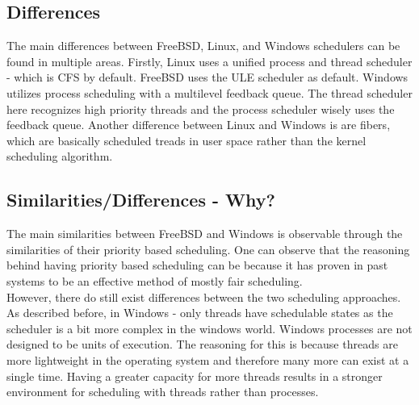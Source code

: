 \documentclass[letterpaper,10pt,titlepage]{article}
\begin{document}
\subsection{Differences}

The main differences between FreeBSD, Linux, and Windows schedulers can be found in multiple areas.  Firstly, Linux uses a unified process and thread scheduler - which is CFS by default.  FreeBSD uses the ULE scheduler as default.  Windows utilizes process scheduling with a multilevel feedback queue.  The thread scheduler here recognizes high priority threads and the process scheduler wisely uses the feedback queue.  Another difference between Linux and Windows is are fibers, which are basically scheduled treads in user space rather than the kernel scheduling algorithm.\\

\subsection{Similarities/Differences - Why?}

The main similarities between FreeBSD and Windows is observable through the similarities of their priority based scheduling.  One can observe that the reasoning behind having priority based scheduling can be because it has proven in past systems to be an effective method of mostly fair scheduling.\\

However, there do still exist differences between the two scheduling approaches.  As described before, in Windows - only threads have schedulable states as the scheduler is a bit more complex in the windows world.  Windows processes are not designed to be units of execution.  The reasoning for this is because threads are more lightweight in the operating system and therefore many more can exist at a single time.  Having a greater capacity for more threads results in a stronger environment for scheduling with threads rather than processes.\\

\newpage


\end{document}
